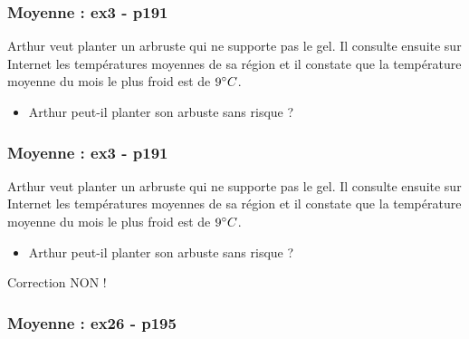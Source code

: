 \documentclass{beamer}
\begin{document}
\begin{frame}
  \frametitle{Moyenne : ex3 - p191}

Arthur veut planter un arbruste qui ne supporte pas le gel. Il consulte ensuite sur Internet les températures moyennes de sa région et il constate que la température moyenne du mois le plus froid est de $9 \degree C$.
  \begin{itemize}
  \item Arthur peut-il planter son arbuste sans risque ?
  \end{itemize}

\end{frame}

\begin{frame}
  \frametitle{Moyenne : ex3 - p191}

Arthur veut planter un arbruste qui ne supporte pas le gel. Il consulte ensuite sur Internet les températures moyennes de sa région et il constate que la température moyenne du mois le plus froid est de $9 \degree C$.
  \begin{itemize}
  \item Arthur peut-il planter son arbuste sans risque ?
  \end{itemize}

  \begin{exampleblock}{Correction}
	NON ! 
  \end{exampleblock}

\end{frame}


\begin{frame}
  \frametitle{Moyenne : ex26 - p195}
  
  
  
\end{frame}  
\end{document}
